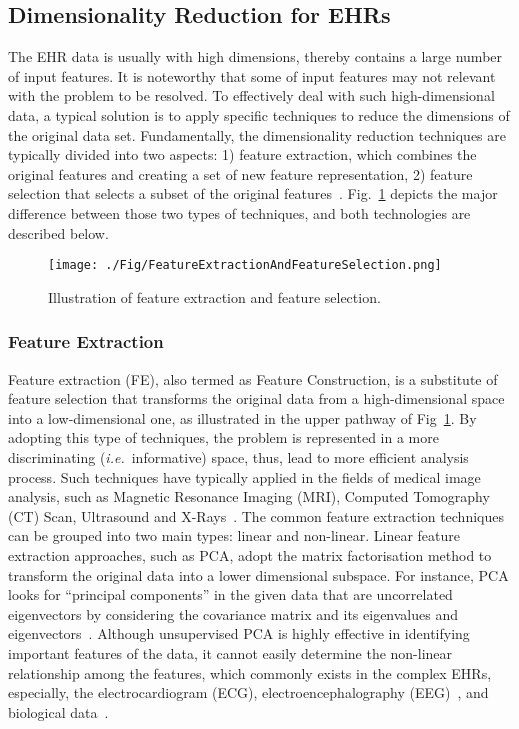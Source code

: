 \documentclass{article}
\newcommand{\zzie}{\emph{i.e.}~}
\newcommand*{\1}{\textcolor{red}}
\begin{document}
\subsection{Dimensionality Reduction for EHRs}\label{sec:relatedworks}
The EHR data is usually with high dimensions, thereby contains a large number of input features. It is noteworthy that some of input features may not relevant with the problem to be resolved. To effectively deal with such high-dimensional data, a typical solution is to apply specific techniques to reduce the dimensions of the original data set. Fundamentally, the dimensionality reduction techniques are typically divided into two aspects: 1) feature extraction, which combines the original features and creating a set of new feature representation, 2) feature selection that selects a subset of the original features~\cite{remeseiro2019review}. Fig.~\ref{fig:fe-fs} depicts the major difference between those two types of techniques, and both technologies are described below.  



\begin{figure}[!htbp]
	\centering
	\texttt{[image: ./Fig/FeatureExtractionAndFeatureSelection.png]}
	\caption{Illustration of feature extraction and feature selection.}\label{fig:fe-fs}
\end{figure}


\subsubsection{Feature Extraction}\label{sec:fe}
Feature extraction (FE), also termed as Feature Construction, is a substitute of feature selection that transforms the original data from a high-dimensional space into a low-dimensional one, as illustrated in the upper pathway of Fig~\ref{fig:fe-fs}. By adopting this type of techniques, the problem is represented in a more discriminating (\zzie informative) space, thus, lead to more efficient analysis process. Such techniques have typically applied in the fields of medical image analysis, such as Magnetic Resonance Imaging (MRI), Computed Tomography (CT) Scan, Ultrasound and X-Rays~\cite{remeseiro2019review}. The common feature extraction techniques can be grouped into two main types: linear and non-linear. Linear feature extraction approaches, such as PCA, adopt the matrix factorisation method to transform the original data into a lower dimensional subspace. For instance, PCA looks for ``principal components'' in the given data that are uncorrelated eigenvectors by considering the covariance matrix and its eigenvalues and eigenvectors~\cite{zuo2018gaze}. Although unsupervised PCA is highly effective in identifying important features of the data, it cannot easily determine the non-linear relationship among the features, which commonly exists in the complex EHRs, especially, the electrocardiogram (ECG), electroencephalography (EEG)~\cite{al2017enhanced}, and biological data~\cite{remeseiro2019review}. 
\end{document}
